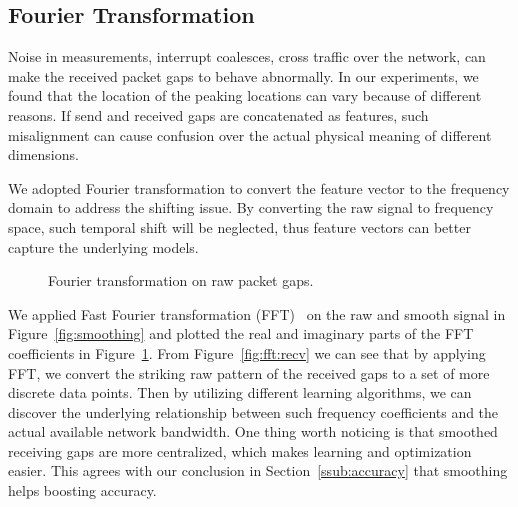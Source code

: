 \subsection{Fourier Transformation}
\label{sub:fourier_transformation}

Noise in measurements, interrupt coalesces, cross traffic over the network, can
make the received packet gaps to behave abnormally. In our experiments, we
found that the location of the peaking locations can vary because of different
reasons. If send and received gaps are concatenated as features, such
misalignment can cause confusion over the actual physical meaning of different
dimensions.

We adopted Fourier transformation to convert the feature vector to the
frequency domain to address the shifting issue. By converting the raw signal to
frequency space, such temporal shift will be neglected, thus feature vectors
can better capture the underlying models.

\begin{figure}[htpb]
   \centering
   \quad
   \caption{Fourier transformation on raw packet gaps.}
   \label{fig:fft}
\end{figure}

We applied Fast Fourier transformation (FFT)~\cite{frigo1998fftw} on the raw
and smooth signal in Figure~\ref{fig:smoothing} and
plotted the real and imaginary parts of the FFT coefficients in
Figure~\ref{fig:fft}. From Figure~\ref{fig:fft:recv} we can see that by
applying FFT, we convert the striking raw pattern of the received gaps to a set
of more discrete data points. Then by utilizing different learning algorithms,
we can discover the underlying relationship between such frequency coefficients
and the actual available network bandwidth. One thing worth noticing is that
smoothed receiving gaps are more centralized, which makes learning and
optimization easier. This agrees with our conclusion in
Section~\ref{ssub:accuracy} that smoothing helps boosting accuracy.

